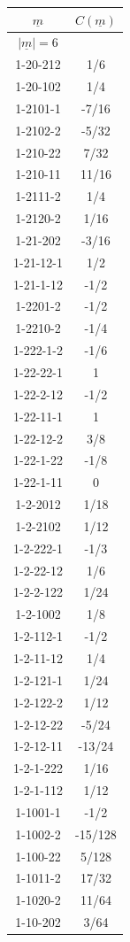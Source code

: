 \begin{tabular}[t]{|cc|}
\hline
$\underline{m}$ & $C(\underline{m})$\\
\hline\hline
$|\underline{m}|=6$&\\
\hline
1-20-212 &  1/6\\
1-20-102 &  1/4\\
1-2101-1 &  -7/16\\
1-2102-2 &  -5/32\\
1-210-22 &  7/32\\
1-210-11 &  11/16\\
1-2111-2 &  1/4\\
1-2120-2 &  1/16\\
1-21-202 &  -3/16\\
1-21-12-1 &  1/2\\
1-21-1-12 &  -1/2\\
1-2201-2 &  -1/2\\
1-2210-2 &  -1/4\\
1-222-1-2 &  -1/6\\
1-22-22-1 &  1\\
1-22-2-12 &  -1/2\\
1-22-11-1 &  1\\
1-22-12-2 &  3/8\\
1-22-1-22 &  -1/8\\
1-22-1-11 &  0\\
1-2-2012 &  1/18\\
1-2-2102 &  1/12\\
1-2-222-1 &  -1/3\\
1-2-22-12 &  1/6\\
1-2-2-122 &  1/24\\
1-2-1002 &  1/8\\
1-2-112-1 &  -1/2\\
1-2-11-12 &  1/4\\
1-2-121-1 &  1/24\\
1-2-122-2 &  1/12\\
1-2-12-22 &  -5/24\\
1-2-12-11 &  -13/24\\
1-2-1-222 &  1/16\\
1-2-1-112 &  1/12\\
1-1001-1 &  -1/2\\
1-1002-2 &  -15/128\\
1-100-22 &  5/128\\
1-1011-2 &  17/32\\
1-1020-2 &  11/64\\
1-10-202 &  3/64\\

\end{tabular}
